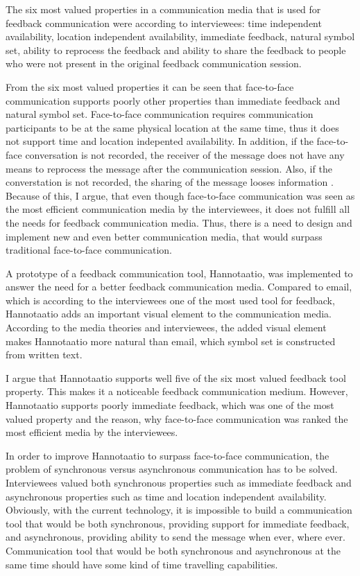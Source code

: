 \documentclass[english,12pt,a4paper,pdftex]{article}
\begin{document}
The six most valued properties in a communication media that is used for feedback communication were according to interviewees: time independent availability, location independent availability, immediate feedback, natural symbol set, ability to reprocess the feedback and ability to share the feedback to people who were not present in the original feedback communication session.

From the six most valued properties it can be seen that face-to-face communication supports poorly other properties than immediate feedback and natural symbol set. Face-to-face communication requires communication participants to be at the same physical location at the same time, thus it does not support time and location indepented availability. In addition, if the face-to-face conversation is not recorded, the receiver of the message does not have any means to reprocess the message after the communication session. Also, if the converstation is not recorded, the sharing of the message looses information \citep{higa2007}. Because of this, I argue, that even though face-to-face communication was seen as the most efficient communication media by the interviewees, it does not fulfill all the needs for feedback communication media. Thus, there is a need to design and implement new and even better communication media, that would surpass traditional face-to-face communication.

A prototype of a feedback communication tool, Hannotaatio, was implemented to answer the need for a better feedback communication media. Compared to email, which is according to the interviewees one of the most used tool for feedback, Hannotaatio adds an important visual element to the communication media. According to the media theories and interviewees, the added visual element makes Hannotaatio more natural than email, which symbol set is constructed from written text. 

I argue that Hannotaatio supports well five of the six most valued feedback tool property. This makes it a noticeable feedback communication medium. However, Hannotaatio supports poorly immediate feedback, which was one of the most valued property and the reason, why face-to-face communication was ranked the most efficient media by the interviewees.

In order to improve Hannotaatio to surpass face-to-face communication, the problem of synchronous versus asynchronous communication has to be solved. Interviewees valued both synchronous properties such as immediate feedback and asynchronous properties such as time and location independent availability. Obviously, with the current technology, it is impossible to build a communication tool that would be both synchronous, providing support for immediate feedback, and asynchronous, providing ability to send the message when ever, where ever. Communication tool that would be both synchronous and asynchronous at the same time should have some kind of time travelling capabilities.
\end{document}
